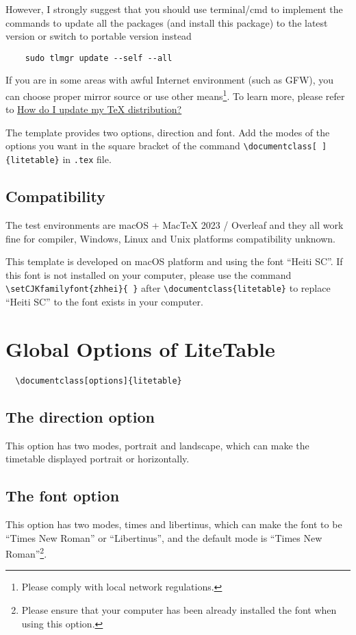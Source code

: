 \documentclass[11pt]{article}
\def\pkg#1{\texorpdfstring{\textcolor{pkgcolor}{\textsf{#1}}}{“#1”}}
\def\mode#1{\texorpdfstring{\textcolor{moducolor}{\textsf{#1}}}{“#1”}}
\begin{document}
However, I strongly suggest that you should use terminal/cmd to implement the commands to update all the packages (and install this package) to the latest version or switch to portable version instead
\begin{verbatim}
    sudo tlmgr update --self --all
\end{verbatim}

If you are in some areas with awful Internet environment (such as GFW), you can choose proper mirror source or use other means\footnote{Please comply with local network regulations.}. To learn more, please refer to \href{https://tex.stackexchange.com/questions/55437/how-do-i-update-my-tex-distribution}{How do I update my \textsf{\TeX} distribution?}

The template provides two options, \mode{direction} and \mode{font}. Add the modes of the options you want in the square bracket of the command \verb|\documentclass[ ]{litetable}| in \verb|.tex| file.

\subsection{Compatibility}
The test environments are macOS + Mac\TeX{} 2023 / Overleaf and they all work fine for \XeLaTeX{} compiler, Windows, Linux and Unix platforms compatibility unknown.

This template is developed on macOS platform and using the font ``Heiti SC''. If this font is not installed on your computer, please use the command \verb|\setCJKfamilyfont{zhhei}{ }| after \verb|\documentclass{litetable}| to replace ``Heiti SC'' to the font exists in your computer.

\section{Global Options of \pkg{LiteTable}}
\begin{verbatim}
  \documentclass[options]{litetable}
\end{verbatim}

\subsection{The \mode{direction} option}
This option has two modes, \mode{portrait} and \mode{landscape}, which can make the timetable displayed portrait or horizontally.

\subsection{The \mode{font} option}
This option has two modes, \mode{times} and \mode{libertinus}, which can make the font to be ``Times New Roman'' or ``Libertinus'', and the default mode is ``Times New Roman''\footnote{Please ensure that your computer has been already installed the font when using this option.}.
\end{document}
